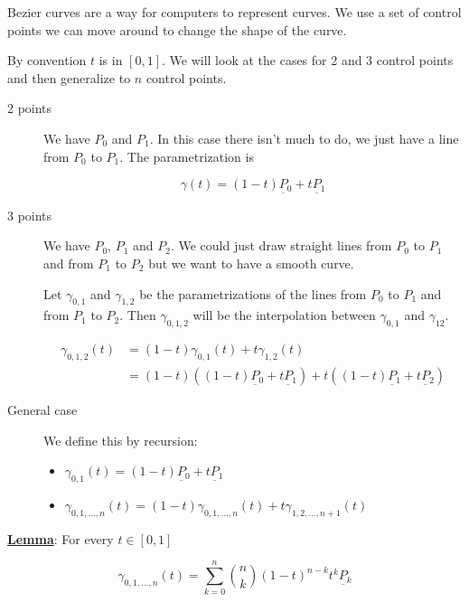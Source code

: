 \documentclass[10pt]{extarticle}
\newcommand{\munderbar}[1]{\underbar{\ensuremath{#1}}}
\begin{document}
Bezier curves are a way for computers to represent curves.
We use a set of control points we can move around to change the shape of the curve.

By convention $t$ is in $[0, 1]$. We will look at the cases for 2 and 3 control points and then generalize to $n$ control points.

\begin{description}
    \item[2 points] We have $P_0$ and $P_1$.
        In this case there isn't much to do, we just have a line from $P_0$ to $P_1$. The parametrization is

        $$
            \gamma(t) = (1 - t) \munderbar{P_0} + t \munderbar{P_1}
        $$

    \item[3 points] We have $P_0$, $P_1$ and $P_2$.
        We could just draw straight lines from $P_0$ to $P_1$ and from $P_1$ to $P_2$ but we want to have a smooth curve.

        Let $\gamma_{0,1}$ and $\gamma_{1,2}$ be the parametrizations of the lines from $P_0$ to $P_1$ and from $P_1$ to $P_2$.
        Then $\gamma_{0,1,2}$ will be the interpolation between $\gamma_{0,1}$ and $\gamma_{12}$.

        \begin{align*}
            \gamma_{0,1,2}(t) & = (1 - t) \gamma_{0,1}(t) + t \gamma_{1,2}(t)                                                                                   \\
                              & = (1 - t) \left((1 - t) \munderbar{P_0} + t \munderbar{P_1}\right) + t \left((1 - t) \munderbar{P_1} + t \munderbar{P_2}\right)
        \end{align*}

    \item[General case] We define this by recursion:
        \begin{itemize}
            \item $\gamma_{0,1}(t) = (1 - t) \munderbar{P_0} + t \munderbar{P_1}$
            \item $\gamma_{0,1, \ldots, n}(t) = (1 - t) \gamma_{0,1, \ldots, n}(t) + t \gamma_{1,2, \ldots, n+1}(t)$
        \end{itemize}
\end{description}

\textbf{\underline{Lemma}}:
For every $t \in [0, 1]$

$$
    \gamma_{0,1, \ldots, n}(t) = \sum_{k=0}^n \binom{n}{k} (1 - t)^{n-k} t^k \munderbar{P_k}
$$
\end{document}

